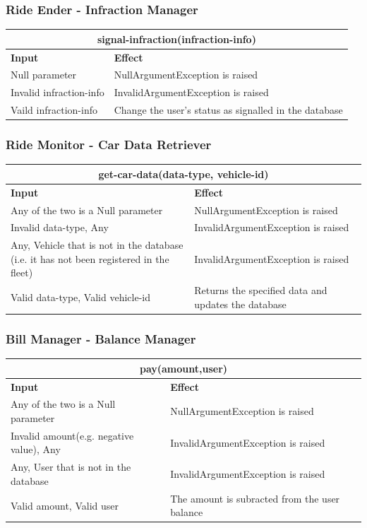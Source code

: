 \documentclass{article}
\begin{document}
\subsubsection{Ride Ender - Infraction Manager}
\begin{tabular}{ |p{5cm}|p{7cm}| }
  \hline
  \multicolumn{2}{|c|}{signal-infraction(infraction-info)} \\
  \hline
  \textbf{Input} & \textbf{Effect} \\
  \hline
  Null parameter & NullArgumentException is raised\\
  \hline
  Invalid infraction-info & InvalidArgumentException is raised \\
  \hline
  Vaild infraction-info & Change the user's status as signalled in the database\\
  \hline
\end{tabular}
\subsubsection{Ride Monitor - Car Data Retriever }
\begin{tabular}{ |p{5cm}|p{7cm}| }
  \hline
  \multicolumn{2}{|c|}{get-car-data(data-type, vehicle-id)} \\
  \hline
  \textbf{Input} & \textbf{Effect} \\
  \hline
  Any of the two is a Null parameter & NullArgumentException is raised\\
  \hline
  Invalid data-type, Any & InvalidArgumentException is raised\\
  \hline
  Any, Vehicle that is not in the database (i.e. it has not been registered in the fleet) & InvalidArgumentException is raised\\
  \hline
   Valid data-type, Valid vehicle-id & Returns the specified data and updates the database\\
  \hline
\end{tabular}
\subsubsection{Bill Manager - Balance Manager }
\begin{tabular}{ |p{5cm}|p{7cm}| }
  \hline
  \multicolumn{2}{|c|}{pay(amount,user)} \\
  \hline
  \textbf{Input} & \textbf{Effect} \\
  \hline
  Any of the two is a Null parameter & NullArgumentException is raised\\
  \hline
  Invalid amount(e.g. negative value), Any & InvalidArgumentException is raised\\
  \hline
  Any, User that is not in the database & InvalidArgumentException is raised\\
  \hline
   Valid amount, Valid user & The amount is subracted from the user balance\\
  \hline
\end{tabular}
\end{document}
